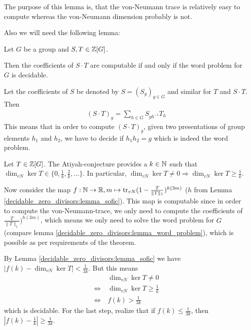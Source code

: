 The purpose of this lemma is, that the von-Neumann trace is relatively easy to compute whereas the von-Neumann dimension probably is not.

Also we will need the following lemma:
\begin{Lemma}
	\label{decidable_zero_divisors:lemma_word_problem}
	Let $G$ be a group
	and $S,T \in \mathbb{Z}[G]$.

	Then the coefficients of $S \cdot T$ are computable if and only if the word problem for $G$ is decidable.
\end{Lemma}
\proof
	Let the coefficients of $S$ be denoted by $S = (S_g)_{g \in G}$ and similar for $T$ and $S \cdot T$.
	Then
	\begin{align*}
		(S \cdot T)_g = \sum_{h \in G} S_{gh^{-1}} T_h
	\end{align*}
	This means that in order to compute $(S \cdot T)_g$, given two presentations of group elements $h_1$ and $h_2$, we have to decide if $h_1 h_2 = g$ which is indeed the word problem.
\endproof

	Let $T \in \mathbb{Z}[G]$.
	The Atiyah-conjecture provides a $k \in \mathbb{N}$ such that $\dim_{vN} \ker T \in \{0, \frac{1}{k},\frac{2}{k},...\}$. %
	In particular, $\dim_{vN} \ker T \neq 0 \Rightarrow \dim_{vN} \ker T \geq \frac1k$.

	Now consider the map $f:\mathbb{N} \to \mathbb{R}, m \mapsto \operatorname{tr}_{vN}(1 - \frac{T}{\|T\|_1})^{h(3m)}$ ($h$ from Lemma \ref{decidable_zero_divisors:lemma_sofic}).
	This map is computable since in order to compute the von-Neumann-trace, we only need to compute the coefficients of $\frac{T}{\|T\|_1})^{h(3m)}$, which means we only need to solve the word problem for $G$ (compare lemma \ref{decidable_zero_divisors:lemma_word_problem}), which is possible as per requirements of the theorem.

	By Lemma \ref{decidable_zero_divisors:lemma_sofic} we have $|f(k) - \dim_{vN} \ker T| < \frac{1}{3k}$. But this means
	\begin{align*}
		& \dim_{vN} \ker T \neq 0 \\
		\iff~& \dim_{vN} \ker T \geq \frac1k \\
		\iff~& f(k) > \frac{1}{3k}
	\end{align*}
	which is decidable. For the last step, realize that if $f(k) \leq \frac{1}{3k}$, then $|f(k) - \frac1k| \geq \frac{1}{3k}$.
\endproof
